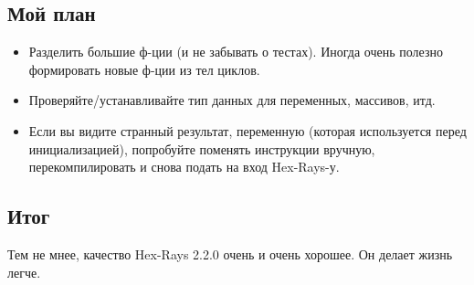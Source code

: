 \subsection{Мой план}

\begin{itemize}
\item Разделить большие ф-ции (и не забывать о тестах).
Иногда очень полезно формировать новые ф-ции из тел циклов.

\item Проверяйте/устанавливайте тип данных для переменных, массивов, итд.

\item Если вы видите странный результат,  переменную (которая используется перед инициализацией),
попробуйте поменять инструкции вручную, перекомпилировать и снова подать на вход Hex-Rays-у.
\end{itemize}

\subsection{Итог}

Тем не мнее, качество Hex-Rays 2.2.0 очень и очень хорошее.
Он делает жизнь легче.

